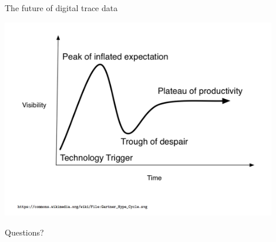 \documentclass{beamer}
\begin{document}
\begin{frame}{The future of digital trace data}

\begin{center}
	\includegraphics[width=0.9\textwidth]{figures/expectations.png}
	
\end{center}

\end{frame}



\begin{frame}[standout]

\begin{center}
	\LARGE
	Questions?
\end{center}

\end{frame}
\end{document}
